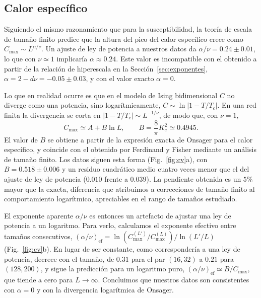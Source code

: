 \documentclass[a4paper,11pt]{article}
\newcommand{\Tc}{T_c}
\begin{document}
\subsection{Calor específico}
\label{sec:cv}
Siguiendo el mismo razonamiento que para la susceptibilidad, la teoría de escala de tamaño finito predice que la altura del pico del calor específico crece como $C_\mathrm{max} \sim L^{\alpha/\nu}$.
Un ajuste de ley de potencia a nuestros datos da $\alpha/\nu = 0.24 \pm 0.01$, lo que con $\nu \simeq 1$ implicaría $\alpha \approx 0.24$.
Este valor es incompatible con el obtenido a partir de la relación de hiperescala en la Sección~\ref{sec:exponentes}, $\alpha = 2 - d\nu = -0.05 \pm 0.03$, y con el valor exacto $\alpha = 0$.

Lo que en realidad ocurre es que en el modelo de Ising bidimensional $C$ no diverge como una potencia, sino logarítmicamente, $C \sim \ln|1 - T/\Tc|$.
En una red finita la divergencia se corta en $|1 - T/\Tc| \sim L^{-1/\nu}$, de modo que, con $\nu = 1$,
\begin{equation}
  C_\mathrm{max} \simeq A + B \ln L , \qquad B = \frac{8}{\pi} K_c^2 \simeq 0.4945 .
  \label{eq:cv_log}
\end{equation}
El valor de $B$ se obtiene a partir de la expresión exacta de Onsager para el calor específico, y coincide con el obtenido por Ferdinand y Fisher \cite{ferdinandBoundedInhomogeneousIsing1969} mediante un análisis de tamaño finito.
Los datos siguen esta forma (Fig.~\ref{fig:cv}a), con $B = 0.518 \pm 0.006$ y un residuo cuadrático medio cuatro veces menor que el del ajuste de ley de potencia ($0.010$ frente a $0.039$).
La pendiente obtenida es un $5\%$ mayor que la exacta, diferencia que atribuimos a correcciones de tamaño finito al comportamiento logarítmico, apreciables en el rango de tamaños estudiado.

El exponente aparente $\alpha/\nu$ es entonces un artefacto de ajustar una ley de potencia a un logaritmo.
Para verlo, calculamos el exponente efectivo entre tamaños consecutivos, $(\alpha/\nu)_\mathrm{ef} = \ln(C_\mathrm{max}^{(L')}/C_\mathrm{max}^{(L)}) / \ln(L'/L)$ (Fig.~\ref{fig:cv}b).
En lugar de ser constante, como correspondería a una ley de potencia, decrece con el tamaño, de $0.31$ para el par $(16, 32)$ a $0.21$ para $(128, 200)$, y sigue la predicción para un logaritmo puro, $(\alpha/\nu)_\mathrm{ef} \simeq B/C_\mathrm{max}$, que tiende a cero para $L \to \infty$.
Concluimos que nuestros datos son consistentes con $\alpha = 0$ y con la divergencia logarítmica de Onsager.
\end{document}
